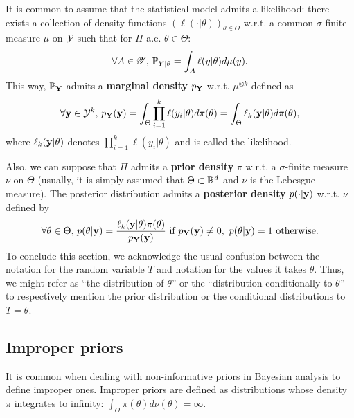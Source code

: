 It is common to assume that the statistical model admits a likelihood: there exists a collection of density functions $(\ell(\cdot|\theta))_{\theta\in\Theta}$  w.r.t. a common  $\sigma$-finite measure $\mu$ on $\mathcal{Y}$ such that for $\Pi$-a.e. $\theta\in\Theta$:
    \begin{equation}
        \forall A\in\mathscr{Y},\,\mathbb{P}_{Y|\theta} = \int_A\ell(y|\theta)d\mu(y).
    \end{equation}
This way, $\mathbb{P}_{\mathbf{Y}}$ admits a \textbf{marginal density} $p_{\mathbf{Y}}$ w.r.t. $\mu^{\otimes k}$ defined as
    \begin{equation}
        \forall\mathbf{y}\in\mathcal{Y}^k,\, p_{\mathbf{Y}}(\mathbf{y}) = \int_\Theta\prod_{i=1}^k\ell(y_i|\theta) d\pi(\theta) = \int_\Theta \ell_k(\mathbf{y}|\theta)d\pi(\theta),
    \end{equation}
where $\ell_k(\mathbf{y}|\theta)$ denotes $\prod_{i=1}^k\ell(y_i|\theta)$ and is called the likelihood.

Also, we can suppose that $\Pi$ admits a \textbf{prior density} $\pi$ w.r.t. a $\sigma$-finite measure $\nu$ on $\Theta$ (usually, it is simply assumed that $\Theta\subset\mathbb{R}^d$ and $\nu$ is the Lebesgue measure). 
The posterior distribution admits a \textbf{posterior density} $p(\cdot|\mathbf{y})$ w.r.t. $\nu$ defined by
    \begin{equation}
        \forall\theta\in\Theta,\, p(\theta|\mathbf{y}) = \frac{\ell_k(\mathbf{y}|\theta)\pi(\theta)}{p_{\mathbf{Y}}(\mathbf{y})}\text{\ if\ } p_{\mathbf{Y}}(\mathbf{y})\ne0,\ p(\theta|\mathbf{y})=1 \text{\ otherwise}.
    \end{equation}
To conclude this section, we acknowledge the usual confusion between the notation for the random variable $T$ and notation for the values it takes $\theta$. Thus, we might refer as ``the distribution of $\theta$'' or the ``distribution conditionally to $\theta$'' to respectively mention the prior distribution or the conditional distributions to $T=\theta$.


\subsection{Improper priors}\label{sec:intro-ref:improperway-around}

It is common when dealing with non-informative priors in Bayesian analysis to define improper ones.
Improper priors are defined as distributions whose density $\pi$ integrates to infinity: $\int_\Theta\pi(\theta)d\nu(\theta)=\infty$. 

